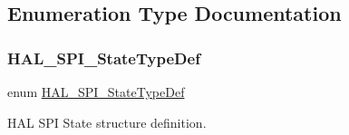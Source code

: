 \subsection{Enumeration Type Documentation}
\mbox{\label{group___s_p_i___exported___types_ga8891cb64e76198a860172d94c638c9b4}} 
\subsubsection{\texorpdfstring{HAL\_SPI\_StateTypeDef}{HAL\_SPI\_StateTypeDef}}
{\footnotesize\ttfamily enum \mbox{\hyperlink{group___s_p_i___exported___types_ga8891cb64e76198a860172d94c638c9b4}{H\+A\+L\+\_\+\+S\+P\+I\+\_\+\+State\+Type\+Def}}}



H\+AL S\+PI State structure definition. 

